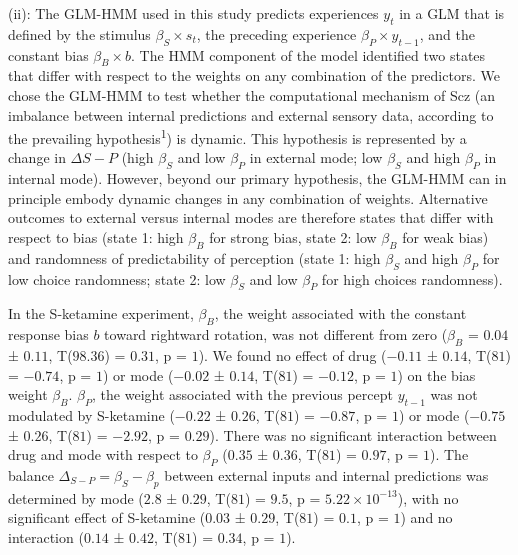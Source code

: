 \documentclass[
]{article}
\begin{document}
(ii): The GLM-HMM used in this study predicts experiences \(y_t\) in a
GLM that is defined by the stimulus \(\beta_S \times s_t\), the
preceding experience \(\beta_P \times y_{t-1}\), and the constant bias
\(\beta_B \times b\). The HMM component of the model identified two
states that differ with respect to the weights on any combination of the
predictors. We chose the GLM-HMM to test whether the computational
mechanism of Scz (an imbalance between internal predictions and external
sensory data, according to the prevailing hypothesis\textsuperscript{1})
is dynamic. This hypothesis is represented by a change in
\(\Delta{S-P}\) (high \(\beta_S\) and low \(\beta_P\) in external mode;
low \(\beta_S\) and high \(\beta_P\) in internal mode). However, beyond
our primary hypothesis, the GLM-HMM can in principle embody dynamic
changes in any combination of weights. Alternative outcomes to external
versus internal modes are therefore states that differ with respect to
bias (state 1: high \(\beta_B\) for strong bias, state 2: low
\(\beta_B\) for weak bias) and randomness of predictability of
perception (state 1: high \(\beta_S\) and high \(\beta_P\) for low
choice randomness; state 2: low \(\beta_S\) and low \(\beta_P\) for high
choices randomness).

In the S-ketamine experiment, \(\beta_B\), the weight associated with
the constant response bias \(b\) toward rightward rotation, was not
different from zero (\(\beta_B\) = \(0.04\) ± \(0.11\), T(\(98.36\)) =
\(0.31\), p = \(1\)). We found no effect of drug (\(-0.11\) ± \(0.14\),
T(\(81\)) = \(-0.74\), p = \(1\)) or mode (\(-0.02\) ± \(0.14\),
T(\(81\)) = \(-0.12\), p = \(1\)) on the bias weight \(\beta_B\).
\(\beta_P\), the weight associated with the previous percept \(y_{t-1}\)
was not modulated by S-ketamine (\(-0.22\) ± \(0.26\), T(\(81\)) =
\(-0.87\), p = \(1\)) or mode (\(-0.75\) ± \(0.26\), T(\(81\)) =
\(-2.92\), p = \(0.29\)). There was no significant interaction between
drug and mode with respect to \(\beta_P\) (\(0.35\) ± \(0.36\),
T(\(81\)) = \(0.97\), p = \(1\)). The balance
\(\Delta_{S-P} = \beta_S - \beta_p\) between external inputs and
internal predictions was determined by mode (\(2.8\) ± \(0.29\),
T(\(81\)) = \(9.5\), p = \(\ensuremath{5.22\times 10^{-13}}\)), with no
significant effect of S-ketamine (\(0.03\) ± \(0.29\), T(\(81\)) =
\(0.1\), p = \(1\)) and no interaction (\(0.14\) ± \(0.42\), T(\(81\)) =
\(0.34\), p = \(1\)).
\end{document}
